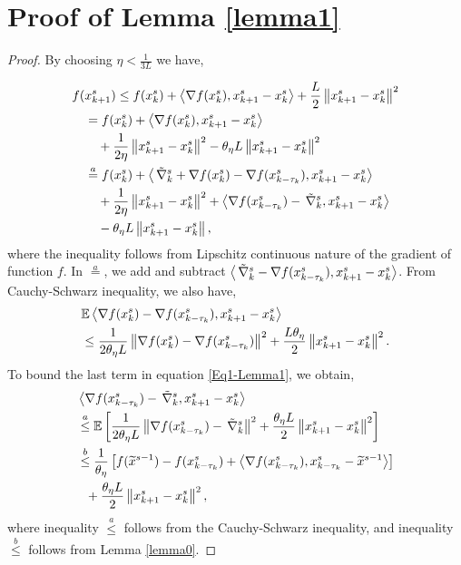 \setcounter{equation}{0}
\setcounter{figure}{0}
\setcounter{table}{0}
\setcounter{page}{1}
\section{Proof of Lemma \ref{lemma1}}\label{append}
\begin{proof}
By choosing $\eta < \frac{1}{3L}$ we have,

\begin{gather}
\label{Eq1-Lemma1}
\begin{split}
f(&x_{k+1}^s)  \leq f(x_{k}^s) + \Iprod{\nabla f(x_{k}^s)}{x_{k+1}^s-x_{k}^s}+\frac{L}{2}\norm{x_{k+1}^s-x_{k}^s}^2\\
&=f(x_{k}^s) + \Iprod{\nabla f(x_{k}^s)}{x_{k+1}^s-x_{k}^s}\\
&~~~+ {\frac{1 }{2\eta}}\norm{x_{k+1}^s-x_{k}^s}^2-{\theta_{\eta} L}\norm{x_{k+1}^s-x_{k}^s}^2\\
&\stackrel{a}{=}f(x_{k}^s) + \Iprod{\VRG+\nabla f(x_{k}^s)-\nabla f(x_{k-\tau_k}^s)}{x_{k+1}^s-x_{k}^s}\\
&~~~+ { \frac{1}{2\eta}}\norm{x_{k+1}^s-x_{k}^s}^2+\Iprod{\nabla f(x_{k-\tau_k}^s)-\VRG}{x_{k+1}^s-x_{k}^s}\\
&~~~-{\theta_{\eta} L}\norm{x_{k+1}^s-x_{k}^s},
\end{split}
\raisetag{15pt}
\end{gather}
where the inequality follows from Lipschitz continuous nature of the gradient of function $f$. In $\stackrel{a}{=}$, we add and subtract $\left\langle \,\tilde{\nabla}_k^s-\nabla f(x_{k-\tau_k}^s),x_{k+1}^s-x_{k}^s\right\rangle$. From Cauchy-Schwarz inequality, we also have,
\begin{equation}\label{Eq2-Lemma3}
\begin{split}
& \mathbb{E}\left\langle \nabla f(x_{k}^s)-\nabla f(x_{k-\tau_k}^s),x_{k+1}^s-x_{k}^s\right\rangle\\
&\leq \frac{1}{2 \theta_{\eta} L} \left\lVert\nabla f(x_{k}^s)-\nabla f(x_{k-\tau_k}^s)\right\rVert^2+ \frac{L\theta_{\eta}}{2}\left\lVert x_{k+1}^s-x_{k}^s\right\rVert^2.
\end{split}
\end{equation}
To bound the last term in equation \eqref{Eq1-Lemma1}, we obtain,
\begin{equation}\label{Eq2-Lemma1}
\begin{split}
&\left\langle \nabla f(x_{k-\tau_{k}}^s)-\,\tilde{\nabla}_k^s,x_{k+1}^s-x_{k}^s\right\rangle\\
&\stackrel{a}{\leq} \mathbb{E}\left[\frac{1}{2\theta_{\eta} L}\left\lVert\nabla f(x_{k-\tau_{k}}^s)-\,\tilde{\nabla}_k^s\right\rVert^2 + \frac{\theta_{\eta} L}{2}\left\lVert x_{k+1}^s-x_{k}^s\right\rVert^2\right]\\
&\stackrel{b}{\leq} \frac{1}{\theta_{\eta}}\left[f(\widetilde{x}^{s-1})-f(x_{k-\tau_k}^s)+\left\langle \nabla f(x_{k-\tau_k}^s),x_{k-\tau_k}^s-\widetilde{x}^{s-1}\right\rangle\right]\\
&~~+ \frac{\theta_{\eta} L}{2}\left\lVert x_{k+1}^{s}-x_{k}^{s}\right\rVert^2,
\end{split}
\end{equation}
where inequality $\stackrel{a}{\leq}$ follows from the Cauchy-Schwarz inequality, and inequality $\stackrel{b}{\leq}$ follows from Lemma \ref{lemma0}. 


\end{proof}
